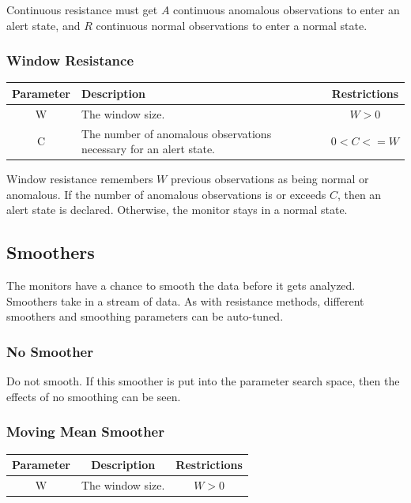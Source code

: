\documentclass[12pt]{ucthesis}
\begin{document}
Continuous resistance must get $A$ continuous anomalous observations to enter an alert state, and $R$ continuous normal
observations to enter a normal state.

\subsubsection{Window Resistance}
\begin{table}[H]
   \begin{center}
      \begin{tabular}{|c|p{9cm}|c|}
         \hline
            Parameter & Description & Restrictions \\
         \hline
            W & The window size. & $ W > 0 $ \\
         \hline
            C & The number of anomalous observations necessary for an alert state. & $ 0 < C <= W $ \\
         \hline
      \end{tabular}
   \end{center}
\end{table}

Window resistance remembers $W$  previous observations as being normal or anomalous. If the number of anomalous
observations is or exceeds $C$, then an alert state is declared. Otherwise, the monitor stays in a normal state.

\subsection{Smoothers}
\label{arch-smoothers}
The monitors have a chance to smooth the data before it gets analyzed.
Smoothers take in a stream of data.
As with resistance methods, different smoothers and smoothing parameters can be auto-tuned.

\subsubsection{No Smoother}
Do not smooth. If this smoother is put into the parameter search space, then the effects of no smoothing can be seen.

\subsubsection{Moving Mean Smoother}
\begin{table}[H]
   \begin{center}
      \begin{tabular}{|c|c|c|}
         \hline
            Parameter & Description & Restrictions \\
         \hline
            W & The window size. & $ W > 0 $ \\
         \hline
      \end{tabular}
   \end{center}
\end{table}
\end{document}
